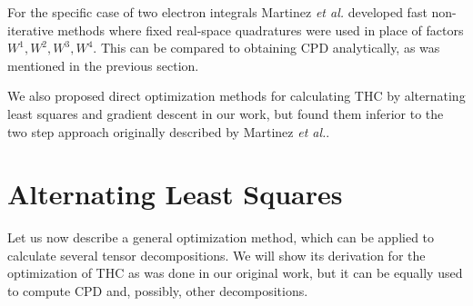 For the specific case of two electron integrals Martinez \emph{et al.} developed 
fast non-iterative methods where fixed real-space quadratures were used in 
place of factors $W^{1}, W^{2}, W^{3}, W^{4}$.\cite{hohenstein_thc3, 
hohenstein_cc2, parrish2013discrete} This can be compared to obtaining CPD 
analytically, as was mentioned in the previous section.

We also proposed direct optimization methods for calculating THC by alternating 
least squares and gradient descent in our work,\cite{schutski2017tensor} but 
found them inferior to the two step approach originally described by Martinez 
\emph{et al.}.\cite{hohenstein_thc1}

\section{Alternating Least Squares
\label{sec:als}}
Let us now describe a general optimization method, which can be applied to 
calculate several tensor decompositions. We will show its derivation for the 
optimization of THC as was done in our original work,\cite{schutski2017tensor} 
but it can be equally used to compute CPD and, possibly, other decompositions.


